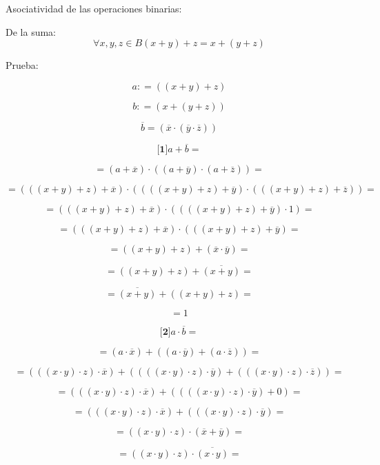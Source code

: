 Asociatividad de las operaciones binarias:

De la suma:
\[\forall x,y,{z \in B}{}{}{}{{{({x + y})} + z} = {x + {({y + z})}}}\]

Prueba:

\[a{: = {({{({x + y})} + z})}}\]

\[b{: = {({x + {({y + z})}})}}\]

\[\overline{b}{}{}{}{= {({\overline{x} \cdot {({\overline{y} \cdot \overline{z}})}})}}\]

\[{\lbrack\mathbf{1}\rbrack}{{a + \overline{b}} =}\]

\[{= {{({a + \overline{x}})} \cdot {({{({a + \overline{y}})} \cdot {({a + \overline{z}})}})}}} =\]

\[{= {{({{({{({x + y})} + z})} + \overline{x}})} \cdot {({{({{({{({x + y})} + z})} + \overline{y}})} \cdot {({{({{({x + y})} + z})} + \overline{z}})}})}}} =\]

\[{= {{({{({{({x + y})} + z})} + \overline{x}})} \cdot {({{({{({{({x + y})} + z})} + \overline{y}})} \cdot 1})}}} =\]

\[{= {{({{({{({x + y})} + z})} + \overline{x}})} \cdot {({{({{({x + y})} + z})} + \overline{y}})}}} =\]

\[{= {{({{({x + y})} + z})} + {({\overline{x} \cdot \overline{y}})}}} =\]

\[{= {{({{({x + y})} + z})} + \overline{({x+y})}}} =\]

\[{= {\overline{({x+y})} + {({{({x + y})} + z})}}} =\]

\[= 1\]

\[{\lbrack\mathbf{2}\rbrack}{{a \cdot \overline{b}} =}\]

\[{= {{({a \cdot \overline{x}})} + {({{({a \cdot \overline{y}})} + {({a \cdot \overline{z}})}})}}} =\]

\[{= {{({{({{({x \cdot y})} \cdot z})} \cdot \overline{x}})} + {({{({{({{({x \cdot y})} \cdot z})} \cdot \overline{y}})} + {({{({{({x \cdot y})} \cdot z})} \cdot \overline{z}})}})}}} =\]

\[{= {{({{({{({x \cdot y})} \cdot z})} \cdot \overline{x}})} + {({{({{({{({x \cdot y})} \cdot z})} \cdot \overline{y}})} + 0})}}} =\]

\[{= {{({{({{({x \cdot y})} \cdot z})} \cdot \overline{x}})} + {({{({{({x \cdot y})} \cdot z})} \cdot \overline{y}})}}} =\]

\[{= {{({{({x \cdot y})} \cdot z})} \cdot {({\overline{x} + \overline{y}})}}} =\]

\[{= {{({{({x \cdot y})} \cdot z})} \cdot \overline{({x\cdot y})}}} =\]

